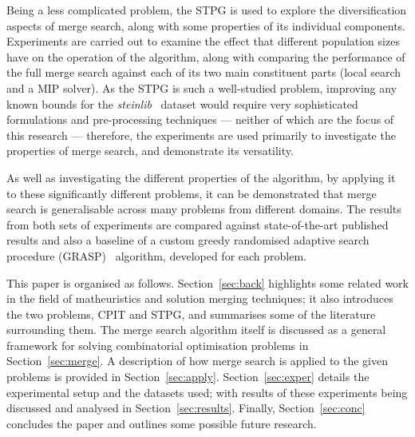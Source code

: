 \documentclass[journal]{IEEEtran}
\begin{document}
Being a less complicated problem, the STPG is used to explore the diversification aspects of merge search, along with some properties of its individual components. Experiments are carried out to examine the effect that different population sizes have on the operation of the algorithm, along with comparing the performance of the full merge search against each of its two main constituent parts (local search and a MIP solver). As the STPG is such a well-studied problem, improving any known bounds for the \emph{steinlib}~\cite{steinlib} dataset would require very sophisticated formulations and pre-processing techniques --- neither of which are the focus of this research --- therefore, the experiments are used primarily to investigate the properties of merge search, and demonstrate its versatility.

As well as investigating the different properties of the algorithm, by applying it to these significantly different problems, it can be demonstrated that merge search is generalisable across many problems from different domains. The results from both sets of experiments are compared against state-of-the-art published results and also a baseline of a custom greedy randomised adaptive search procedure (GRASP)~\cite{grasp:feo} algorithm, developed for each problem.

This paper is organised as follows. Section~\ref{sec:back} highlights some related work in the field of matheuristics and solution merging techniques; it also introduces the two problems, CPIT and STPG, and summarises some of the literature surrounding them. The merge search algorithm itself is discussed as a general framework for solving combinatorial optimisation problems in Section~\ref{sec:merge}. A description of how merge search is applied to the given problems is provided in Section~\ref{sec:apply}. Section~\ref{sec:exper} details the experimental setup and the datasets used; with results of these experiments being discussed and analysed in Section~\ref{sec:results}. Finally, Section~\ref{sec:conc} concludes the paper and outlines some possible future research.

\end{document}
